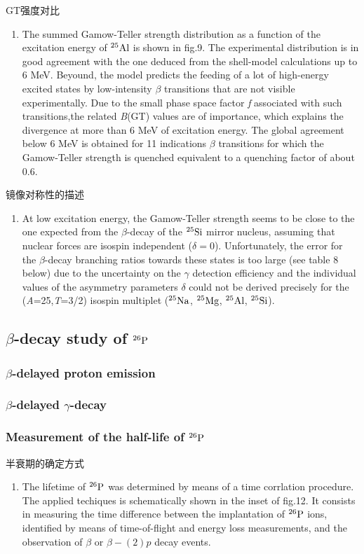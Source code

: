 \documentclass[UTF8]{ctexart}
\begin{document}
GT强度对比
\begin{enumerate}
    \item The summed Gamow-Teller strength distribution as a function of the excitation energy of $^{25}\textnormal{Al}$ is shown in fig.9. The experimental distribution is in good agreement with the one deduced from the shell-model calculations up to 6 MeV. Beyound, the model predicts the feeding of a lot of high-energy excited states by low-intensity $\beta$ transitions that are not visible experimentally. Due to the small phase space factor \textit{f} associated with such transitions,the related \textit{B}(GT) values are of importance, which explains the divergence at more than 6 MeV of excitation energy. The global agreement below 6 MeV is obtained for 11 indications $\beta$ transitions for which the Gamow-Teller strength is quenched equivalent to a quenching factor of about 0.6.
\end{enumerate}


镜像对称性的描述
\begin{enumerate}
    \item At low excitation energy, the Gamow-Teller strength seems to be close to the one expected from the $\beta$-decay of the $^{25}\textnormal{Si}$ mirror nucleus, assuming that nuclear forces are isospin independent ($\delta=0$). Unfortunately, the error for the $\beta$-decay branching ratios towards these states is too large (see table 8 below) due to the uncertainty on the $\gamma$ detection efficiency and the individual values of the asymmetry parameters $\delta$ could not be derived precisely for the (\textit{A}=25,\textit{T}=3/2) isospin multiplet ($^{25}\textnormal{Na}$, $^{25}\textnormal{Mg}$, $^{25}\textnormal{Al}$, $^{25}\textnormal{Si}$).
\end{enumerate}

\subsection{$\beta$-decay study of $^{26}\textnormal{P}$}

\subsubsection{$\beta$-delayed proton emission}
\subsubsection{$\beta$-delayed $\gamma$-decay}
\subsubsection{Measurement of the half-life of $^{26}\textnormal{P}$}
半衰期的确定方式
\begin{enumerate}
    \item The lifetime of $^{26}\textnormal{P}$ was determined by means of a time corrlation procedure. The applied techiques is schematically shown in the inset of fig.12. It consists in measuring the time difference between the implantation of $^{26}\textnormal{P}$ ions, identified by means of time-of-flight and energy loss measurements, and the observation of $\beta$ or $\beta-(2)p$ decay events.
\end{enumerate}
\end{document}
